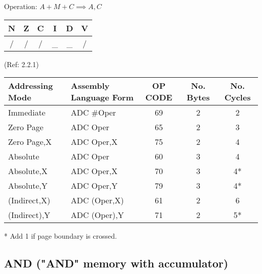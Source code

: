 \documentclass{article}
\begin{document}
  Operation:  $A + M + C \implies A, C$
  \begin{table}[H]
  \centering
  \begin{tabular}{|c c c c c c|}
  \hline
  N & Z & C & I & D & V\\
  \hline
  / & / & / &\_ & \_ & /\\
  \hline
  \end{tabular}
  \end{table}
                                (Ref: 2.2.1)
  \begin{table}[H]
  \centering
  \begin{tabular}{|l|l|c|c|c|}
  \hline
  Addressing Mode & Assembly Language Form & OP CODE & No. Bytes & No. Cycles\\
  \hline
  Immediate    &   ADC \#Oper        &      69   &   2    &    2\\
  Zero Page    &   ADC Oper         &      65   &   2    &    3\\     
  Zero Page,X  &   ADC Oper,X       &      75   &   2    &    4\\     
  Absolute     &   ADC Oper         &      60   &   3    &    4\\     
  Absolute,X   &   ADC Oper,X       &      70   &   3    &    4*\\    
  Absolute,Y   &   ADC Oper,Y       &      79   &   3    &    4*\\    
  (Indirect,X)  &  ADC (Oper,X)     &      61   &   2    &    6\\     
  (Indirect),Y  &  ADC (Oper),Y     &      71   &   2    &    5*\\    
  \hline
  \end{tabular}
  \end{table}
  * Add 1 if page boundary is crossed.


  \subsection{AND ("AND" memory with accumulator)}
\end{document}
